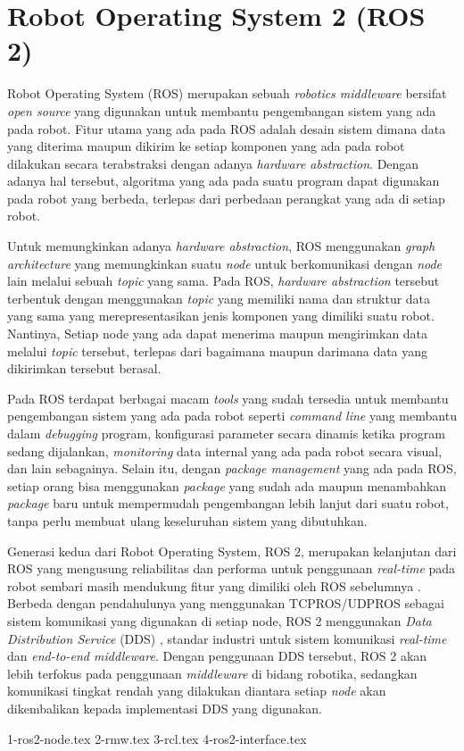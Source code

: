 \section{Robot Operating System 2 (ROS 2)}
\label{sec:ros2}

Robot Operating System (ROS) \citep{cit:quigley2009} merupakan sebuah \emph{robotics middleware} bersifat \emph{open source} yang digunakan untuk membantu pengembangan sistem yang ada pada robot.
Fitur utama yang ada pada ROS adalah desain sistem dimana data yang diterima maupun dikirim ke setiap komponen yang ada pada robot dilakukan secara terabstraksi dengan adanya \emph{hardware abstraction}.
Dengan adanya hal tersebut,
	algoritma yang ada pada suatu program dapat digunakan pada robot yang berbeda,
	terlepas dari perbedaan perangkat yang ada di setiap robot.

Untuk memungkinkan adanya \emph{hardware abstraction},
	ROS menggunakan \emph{graph architecture} yang memungkinkan suatu \emph{node} untuk berkomunikasi dengan \emph{node} lain melalui sebuah \emph{topic} yang sama.
Pada ROS, \emph{hardware abstraction} tersebut terbentuk dengan menggunakan \emph{topic} yang memiliki nama dan struktur data yang sama yang merepresentasikan jenis komponen yang dimiliki suatu robot.
Nantinya, Setiap node yang ada dapat menerima maupun mengirimkan data melalui \emph{topic} tersebut,
	terlepas dari bagaimana maupun darimana data yang dikirimkan tersebut berasal.

Pada ROS terdapat berbagai macam \emph{tools} yang sudah tersedia untuk membantu pengembangan sistem yang ada pada robot seperti \emph{command line} yang membantu dalam \emph{debugging} program,
	konfigurasi parameter secara dinamis ketika program sedang dijalankan,
	\emph{monitoring} data internal yang ada pada robot secara visual,
	dan lain sebagainya.
Selain itu, dengan \emph{package management} yang ada pada ROS,
	setiap orang bisa menggunakan \emph{package} yang sudah ada maupun menambahkan \emph{package} baru untuk mempermudah pengembangan lebih lanjut dari suatu robot,
	tanpa perlu membuat ulang keseluruhan sistem yang dibutuhkan.

Generasi kedua dari Robot Operating System, ROS 2,
	merupakan kelanjutan dari ROS yang mengusung reliabilitas dan performa untuk penggunaan \emph{real-time} pada robot sembari masih mendukung fitur yang dimiliki oleh ROS sebelumnya \citep{cit:maruyama2016}.
Berbeda dengan pendahulunya yang menggunakan TCPROS/UDPROS sebagai sistem komunikasi yang digunakan di setiap node,
	ROS 2 menggunakan \emph{Data Distribution Service} (DDS) \citep{cit:castellote2003} \citep{cit:schlesselman2004}, standar industri untuk sistem komunikasi \emph{real-time} dan \emph{end-to-end middleware}.
Dengan penggunaan DDS tersebut, ROS 2 akan lebih terfokus pada penggunaan \emph{middleware} di bidang robotika,
	sedangkan komunikasi tingkat rendah yang dilakukan diantara setiap \emph{node} akan dikembalikan kepada implementasi DDS yang digunakan.

{1-ros2-node.tex}
{2-rmw.tex}
{3-rcl.tex}
{4-ros2-interface.tex}

